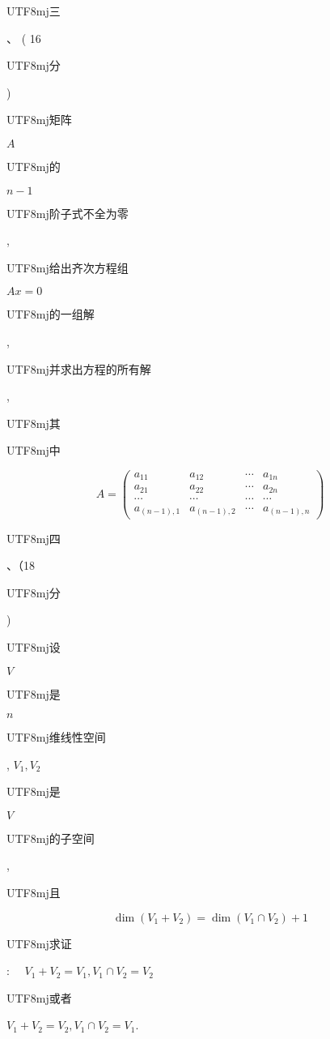 \documentclass[10pt]{article}
\begin{document}
\begin{CJK}{UTF8}{mj}三\end{CJK}、 ( 16 \begin{CJK}{UTF8}{mj}分\end{CJK}) \begin{CJK}{UTF8}{mj}矩阵\end{CJK} $A$ \begin{CJK}{UTF8}{mj}的\end{CJK} $n-1$ \begin{CJK}{UTF8}{mj}阶子式不全为零\end{CJK}, \begin{CJK}{UTF8}{mj}给出齐次方程组\end{CJK} $A x=0$ \begin{CJK}{UTF8}{mj}的一组解\end{CJK}, \begin{CJK}{UTF8}{mj}并求出方程的所有解\end{CJK}, \begin{CJK}{UTF8}{mj}其\end{CJK} \begin{CJK}{UTF8}{mj}中\end{CJK}
$$
A=\left(\begin{array}{cccc}
a_{11} & a_{12} & \cdots & a_{1 n} \\
a_{21} & a_{22} & \cdots & a_{2 n} \\
\cdots & \cdots & \cdots & \cdots \\
a_{(n-1), 1} & a_{(n-1), 2} & \cdots & a_{(n-1), n}
\end{array}\right)
$$
\begin{CJK}{UTF8}{mj}四\end{CJK}、（18 \begin{CJK}{UTF8}{mj}分\end{CJK}) \begin{CJK}{UTF8}{mj}设\end{CJK} $V$ \begin{CJK}{UTF8}{mj}是\end{CJK} $n$ \begin{CJK}{UTF8}{mj}维线性空间\end{CJK}, $V_{1}, V_{2}$ \begin{CJK}{UTF8}{mj}是\end{CJK} $V$ \begin{CJK}{UTF8}{mj}的子空间\end{CJK}, \begin{CJK}{UTF8}{mj}且\end{CJK}
$$
\operatorname{dim}\left(V_{1}+V_{2}\right)=\operatorname{dim}\left(V_{1} \cap V_{2}\right)+1
$$
\begin{CJK}{UTF8}{mj}求证\end{CJK}: $\quad V_{1}+V_{2}=V_{1}, V_{1} \cap V_{2}=V_{2}$ \begin{CJK}{UTF8}{mj}或者\end{CJK} $V_{1}+V_{2}=V_{2}, V_{1} \cap V_{2}=V_{1}$.
\end{document}
